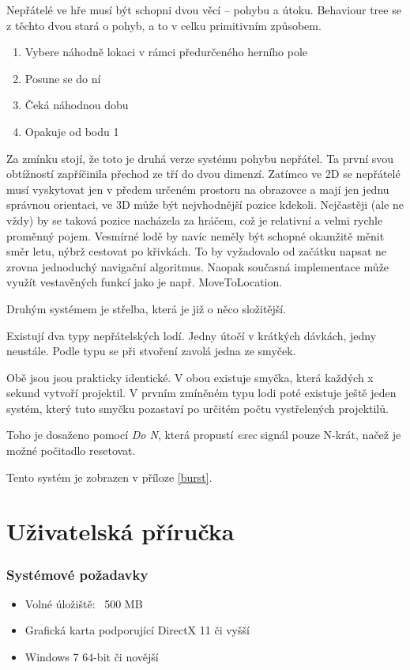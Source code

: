 \documentclass[12pt,a4paper,hidelinks]{article}
\begin{document}
Nepřátelé ve hře musí být schopni dvou věcí – pohybu a útoku. Behaviour tree se z těchto dvou stará o pohyb, a to v celku primitivním způsobem.
\begin{enumerate}
	\item Vybere náhodně lokaci v rámci předurčeného herního pole
	\item Posune se do ní
	\item Čeká náhodnou dobu
	\item Opakuje od bodu 1
\end{enumerate}

Za zmínku stojí, že toto je druhá verze systému pohybu nepřátel. Ta první svou obtížností zapříčinila přechod ze tří do dvou dimenzí. Zatímco ve 2D se nepřátelé musí vyskytovat jen v předem určeném prostoru na obrazovce a mají jen jednu správnou orientaci, ve 3D může být nejvhodnější pozice kdekoli. Nejčastěji (ale ne vždy) by se taková pozice nacházela za hráčem, což je relativní a velmi rychle proměnný pojem. Vesmírné lodě by navíc neměly být schopné okamžitě měnit směr letu, nýbrž cestovat po křivkách. To by vyžadovalo od začátku napsat ne zrovna jednoduchý navigační algoritmus. Naopak současná implementace může využít vestavěných funkcí jako je např. MoveToLocation\cite{uedocs:moveto}.

Druhým systémem je střelba, která je již o něco složitější.

Existují dva typy nepřátelských lodí. Jedny útočí v krátkých dávkách, jedny neustále. Podle typu se při stvoření zavolá jedna ze smyček.

Obě jsou jsou prakticky identické. V obou existuje smyčka, která každých x sekund vytvoří projektil. V prvním zmíněném typu lodi poté existuje ještě jeden systém, který tuto smyčku pozastaví po určitém počtu vystřelených projektilů.

Toho je dosaženo pomocí \textit{Do N}, která propustí \textit{exec} signál pouze N-krát, načež je možné počitadlo resetovat.

Tento systém je zobrazen v příloze \ref{burst}.

\clearpage
\part{Uživatelská příručka}
\section{Systémové požadavky}
\begin{itemize}
	\item Volné úložiště: ~500 MB
	\item Grafická karta podporující DirectX 11 či vyšší
	\item Windows 7 64-bit či novější
\end{itemize}
\end{document}
